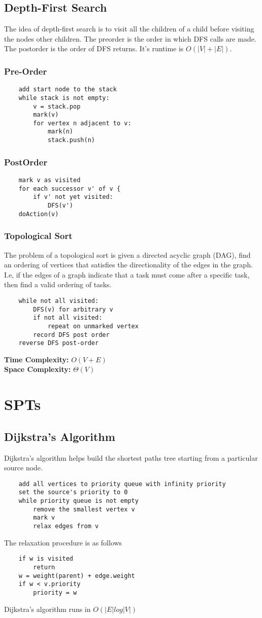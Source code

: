 \documentclass{article}
\begin{document}
\subsection{Depth-First Search}
The idea of depth-first search is to visit all the children of a child before visiting the nodes other children.
The preorder is the order in which DFS calls are made. The postorder is the order of DFS returns.
It's runtime is $O(|V|+|E|)$.
\subsubsection{Pre-Order}
\begin{lstlisting}
    add start node to the stack
    while stack is not empty:
        v = stack.pop
        mark(v)
        for vertex n adjacent to v:
            mark(n)
            stack.push(n)
\end{lstlisting}
\subsubsection{PostOrder}
\begin{lstlisting}
    mark v as visited
    for each successor v' of v {
        if v' not yet visited:
            DFS(v')
    doAction(v)
\end{lstlisting}
\subsubsection{Topological Sort}
The problem of a topological sort is given a directed acyclic graph (DAG), find an ordering of vertices that satisfies the directionality of the edges in the graph.
I.e, if the edges of a graph indicate that a task must come after a specific task, then find a valid ordering of tasks.
\begin{lstlisting}
    while not all visited:
        DFS(v) for arbitrary v
        if not all visited:
            repeat on unmarked vertex
        record DFS post order
    reverse DFS post-order
\end{lstlisting}
\textbf{Time Complexity: } $O(V+E)$\\
\textbf{Space Complexity: } $\Theta(V)$
\section{SPTs}
\subsection{Dijkstra's Algorithm}
Dijkstra's algorithm helps build the shortest paths tree starting from a particular source node.
\begin{lstlisting}
    add all vertices to priority queue with infinity priority
    set the source's priority to 0
    while priority queue is not empty
        remove the smallest vertex v
        mark v 
        relax edges from v
\end{lstlisting}
The relaxation procedure is as follows
\begin{lstlisting}
    if w is visited
        return
    w = weight(parent) + edge.weight
    if w < v.priority
        priority = w
\end{lstlisting}
Dijkstra's algorithm runs in $O(|E|log|V|)$
\end{document}
